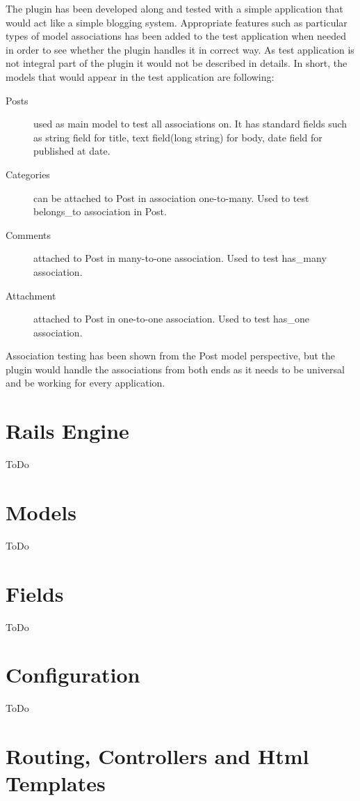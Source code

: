     The plugin has been developed along and tested with a simple application that would act like a simple blogging
    system. Appropriate features such as particular types of model associations has been added to the test application
    when needed in order to see whether the plugin handles it in correct way. As test application is not integral 
    part of the plugin it would not be described in details. In short, the models that would appear in the test application are
    following:
      \begin{description}
        \item[Posts] used as main model to test all associations on. It has standard fields such as string field for title,
          text field(long string) for body, date field for published at date.
        \item[Categories] can be attached to Post in association one-to-many. Used to test belongs\_to association in Post.
        \item[Comments] attached to Post in many-to-one association. Used to test has\_many association.
        \item[Attachment] attached to Post in one-to-one association. Used to test has\_one association.
      \end{description}
      
    Association testing has been shown from the Post model perspective, but the plugin would handle the associations
    from both ends as it needs to be universal and be working for every application.
    
  \section{Rails Engine}
    ToDo
  \section{Models}
    ToDo
  \section{Fields}
    ToDo
  \section{Configuration}
    ToDo
  \section{Routing, Controllers and Html Templates}
      